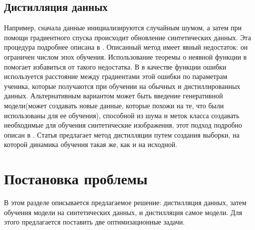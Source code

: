 \documentclass[12pt]{article}
\begin{document}



\subsection{Дистилляция данных}
Например, сначала данные инициализируются случайным шумом, а затем при помощи градиентного спуска происходит обновление синтетических данных. Эта процедура подробнее описана в \cite{wang2018dataset}. Описанный метод имеет явный недостаток: он ограничен числом эпох обучения. Использование теоремы о неявной функции в \cite{lorraine2020optimizing} помогает избавиться от такого недостатка. В \cite{zhao2020dataset} в качестве функции ошибки используется расстояние между градиентами этой ошибки по параметрам ученика, которые получаются при обучении на обычных и дистиллированных данных. Альтернативным вариантом может быть введение генеративной модели(может создавать новые данные, которые похожи на те, что были использованы для ее обучения), способной из шума и меток класса создавать необходимые для обучения синтетические изображения, этот подход подробно описан в \cite{such2020generative}.
Статья \cite{cazenavette2022dataset} предлагает метод дистилляции путем создания выборки, на которой динамика обучения такая же, как и на исходной.





\section{Постановка проблемы}


В этом разделе описывается предлагаемое решение: дистилляция данных, затем обучения модели на синтетических данных, и дистилляция самое модели. Для этого предлагается поставить две оптимизационные задачи.
\end{document}
